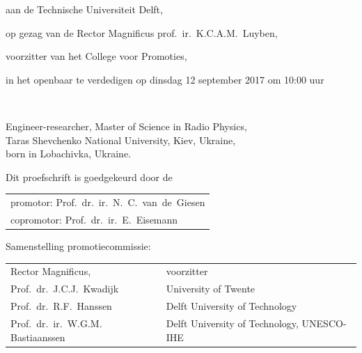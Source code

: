 \begin{titlepage}
\begin{center}
	aan de Technische Universiteit Delft,
	
	op gezag van de Rector Magnificus prof.~ir.~K.C.A.M.~Luyben,
	
	voorzitter van het College voor Promoties,
	
	in het openbaar te verdedigen op dinsdag 12 september 2017 om 10:00 uur
	
	\bigskip
	\bigskip
	
	
	\bigskip
	\bigskip
	
	\makeatletter
	{\Large\titlefont\bfseries\@firstname\ {\titleshape\@lastname}}
	\makeatother
	
	\bigskip
	\bigskip
	
	Engineer-researcher, Master of Science in Radio Physics, \\
	Taras Shevchenko National University, Kiev, Ukraine, \\
	born in Lobachivka, Ukraine.
	
	\vspace*{2\bigskipamount}
	
\end{center}

\clearpage
\thispagestyle{empty}

\noindent Dit proefschrift is goedgekeurd door de

\medskip\noindent
\begin{tabular}{l}
	promotor: Prof.\ dr.\ ir.\ N.\ C.\ van\ de\ Giesen \\
	copromotor: Prof.\ dr.\ ir.\ E.\ Eisemann
\end{tabular}

\bigskip
\noindent Samenstelling promotiecommissie:

\medskip\noindent
\begin{tabular}{p{5cm}l}
	Rector Magnificus, & voorzitter \\
	
	Prof.\ dr.\ J.C.J.\ Kwadijk & University of Twente \\
	
	Prof.\ dr.\ R.F.\ Hanssen & Delft University of Technology \\
	
	Prof.\ dr.\ ir.\ W.G.M. Bastiaanssen & Delft University of Technology, UNESCO-IHE \\
	

\end{tabular}
\end{titlepage}
